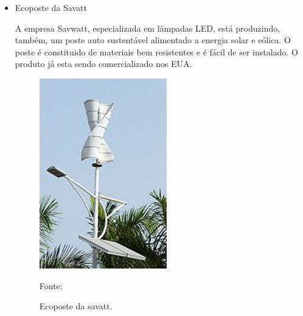 \begin{itemize}
	\item Ecoposte da Savatt
	
	A empresa Savwatt, especializada em lâmpadas LED, está produzindo, também, um poste auto sustentável alimentado a energia solar e eólica. O poste é constituido de materiais bem resistentes e é fácil de ser instalado. O produto já esta sendo comercializado nos EUA.
	
	\begin{figure}[H]
	 \centering
	\label{Ecoposte da savatt}
	 \includegraphics[keepaspectratio=true,scale=0.8]{postes/2.png}
	 \caption{Ecoposte da savatt.}
	 \small{Fonte: }
	\end{figure}

\end{itemize}
	

